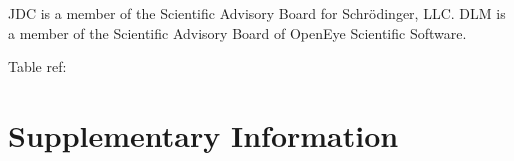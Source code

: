 \documentclass[9pt,lineno,final]{elife}
\newcommand{\beginsupplement}{%
        \setcounter{table}{0}
        \renewcommand{\thetable}{S\arabic{table}}%
        \setcounter{figure}{0}
        \renewcommand{\thefigure}{S\arabic{figure}}%
     }
\begin{document}
JDC is a member of the Scientific Advisory Board for Schr\"{o}dinger, LLC.
DLM is a member of the Scientific Advisory Board of OpenEye Scientific Software.

Table ref: \cite{ACD-pKa-galas, ACD-pKa-classic, simulation-plus-pKa, chemicalize-pKa, moka-pKa}







\newpage
\beginsupplement
\section{Supplementary Information}
\end{document}
